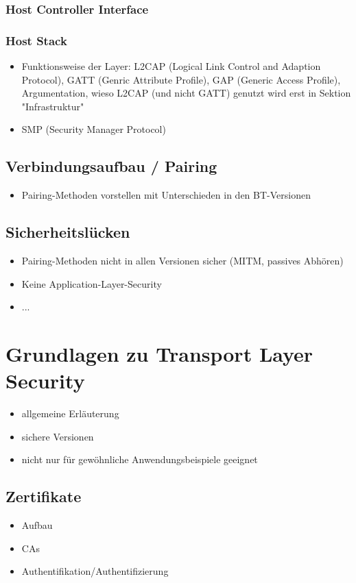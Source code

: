 \documentclass[doktyp=barbeit]{TUBAFarbeiten}
\begin{document}
	\subsubsection{Host Controller Interface}
	\subsubsection{Host Stack}
	\begin{itemize}
		\item Funktionsweise der Layer: L2CAP (Logical Link Control and Adaption Protocol), GATT (Genric Attribute Profile), GAP (Generic Access Profile), Argumentation, wieso L2CAP (und nicht GATT) genutzt wird erst in Sektion "Infrastruktur"
		\item SMP (Security Manager Protocol)
	\end{itemize}
\subsection{Verbindungsaufbau / Pairing}
\begin{itemize}
	\item Pairing-Methoden vorstellen mit Unterschieden in den BT-Versionen
\end{itemize}
\subsection{Sicherheitslücken}
\begin{itemize}
	\item Pairing-Methoden nicht in allen Versionen sicher (MITM, passives Abhören)
	\item Keine Application-Layer-Security
	\item ...
\end{itemize}

\section{Grundlagen zu Transport Layer Security}
\begin{itemize}
	\item allgemeine Erläuterung
	\item sichere Versionen
	\item nicht nur für gewöhnliche Anwendungsbeispiele geeignet
\end{itemize}
\subsection{Zertifikate}
\begin{itemize}
	\item Aufbau
	\item CAs
	\item Authentifikation/Authentifizierung
\end{itemize}
\end{document}
